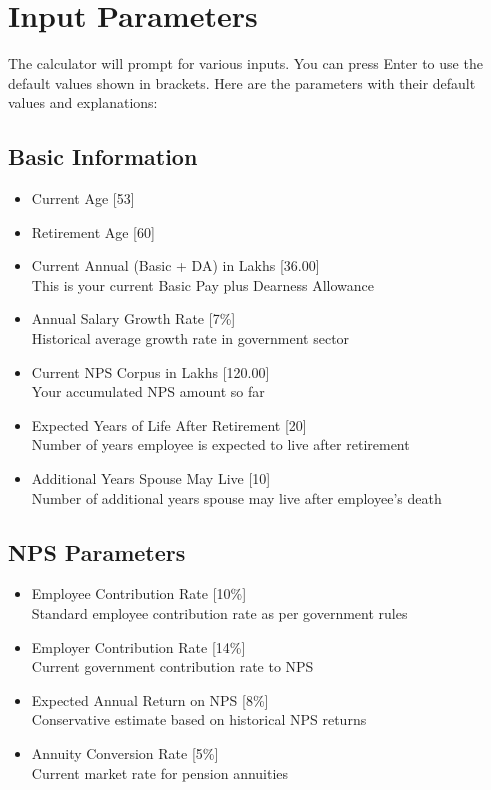 \documentclass{article}
\begin{document}
\section{Input Parameters}
The calculator will prompt for various inputs. You can press Enter to use the default values shown in brackets. Here are the parameters with their default values and explanations:

\subsection{Basic Information}
\begin{itemize}
    \item Current Age [53]
    \item Retirement Age [60]
    \item Current Annual (Basic + DA) in Lakhs [36.00] \\
          This is your current Basic Pay plus Dearness Allowance
    \item Annual Salary Growth Rate [7\%] \\
          Historical average growth rate in government sector
    \item Current NPS Corpus in Lakhs [120.00] \\
          Your accumulated NPS amount so far
    \item Expected Years of Life After Retirement [20] \\
          Number of years employee is expected to live after retirement
    \item Additional Years Spouse May Live [10] \\
          Number of additional years spouse may live after employee's death
\end{itemize}

\subsection{NPS Parameters}
\begin{itemize}
    \item Employee Contribution Rate [10\%] \\
          Standard employee contribution rate as per government rules
    \item Employer Contribution Rate [14\%] \\
          Current government contribution rate to NPS
    \item Expected Annual Return on NPS [8\%] \\
          Conservative estimate based on historical NPS returns
    \item Annuity Conversion Rate [5\%] \\
          Current market rate for pension annuities
\end{itemize}
\end{document}
